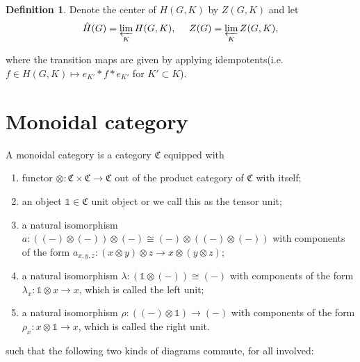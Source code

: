 \documentclass[12pt,a4paper,english]{article}
\theoremstyle{plain}
\theoremstyle{definition}
\newtheorem{defi}{Definition}
\begin{document}
 \begin{defi}
 Denote the center of $H(G, K)$ by $Z(G, K)$ and let 
 \begin{equation*}
     \hat{H}(G)=\varprojlim_{K} H(G, K),\ \ \ \ Z(G)=\varprojlim_{K} Z(G, K),
 \end{equation*}
 \end{defi}
 where the transition maps are given by applying idempotents(i.e.  $f\in H(G, K)\mapsto e_{K'}*f*e_{K'}$ for $K'\subset K$).  
 \newpage
\section{Monoidal category}
A monoidal category is a category $\mathfrak{C}$ equipped with 
\begin{enumerate}
    \item functor $\otimes: \mathfrak{C}\times \mathfrak{C}\rightarrow \mathfrak{C}$ out of the product category of $\mathfrak{C}$ with itself;
    \item an object $\mathbb{1}\in \mathfrak{C}$ unit object or we call this as the tensor unit;
    \item a natural isomorphism $a:((-)\otimes(-))\otimes(-)\cong(-)\otimes((-)\otimes(-))$ with components of the form $a_{x,y,z}: (x\otimes y)\otimes z\rightarrow x\otimes(y\otimes z)$;
    \item a natural isomorphism $\lambda: (\mathbb{1}\otimes(-))\cong(-)$ with components of the form $\lambda_{x}:\mathbb{1}\otimes x\rightarrow x$, which is called the left unit;
    \item a natural isomorphism $\rho:((-)\otimes\mathbb{1})\rightarrow (-)$ with components of the form $\rho_{x}:x\otimes\mathbb{1}\rightarrow x$, which is called the right unit.
\end{enumerate}
such that the following two kinds of diagrams commute, for all involved:
\end{document}
